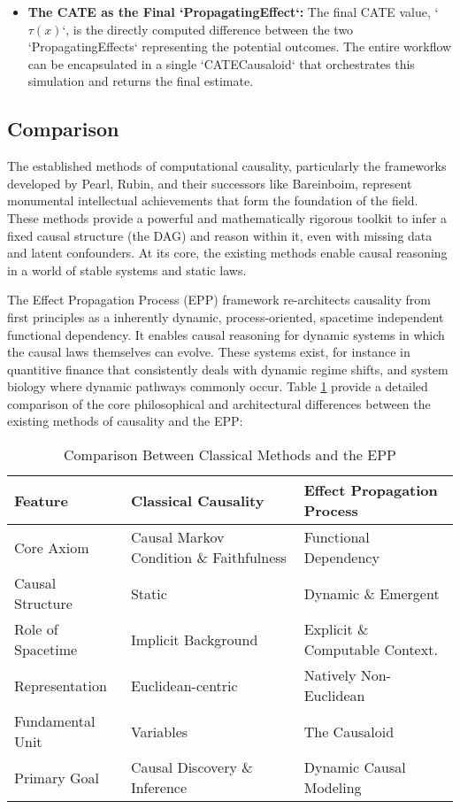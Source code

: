 \begin{itemize}
\item \textbf{The CATE as the Final `PropagatingEffect`:}
The final CATE value, `$\tau(x)$`, is the directly computed difference between the two `PropagatingEffects` representing the potential outcomes. The entire workflow can be encapsulated in a single `CATECausaloid` that orchestrates this simulation and returns the final estimate.
\end{itemize}


\subsection{Comparison}
\label{sec:epp_comparison}

The established methods of computational causality, particularly the frameworks developed by Pearl, Rubin, and their successors like Bareinboim, represent monumental intellectual achievements that form the foundation of the field. These methods provide a powerful and mathematically rigorous toolkit to infer a fixed causal structure (the DAG) and reason within it, even with missing data and latent confounders. At its core, the existing methods enable causal reasoning in a world of stable systems and static laws.

The Effect Propagation Process (EPP) framework re-architects causality from first principles as a  inherently dynamic, process-oriented, spacetime independent functional dependency. It enables causal reasoning for dynamic systems in which the causal laws themselves can evolve. These systems exist, for instance in quantitive finance that consistently deals with dynamic regime shifts, and system biology where dynamic pathways commonly occur. Table \ref{tab:epp_comparison} provide a detailed comparison of the core philosophical and architectural differences between the existing methods of causality and the EPP:


\begin{table}[h!]
\caption{Comparison Between Classical Methods and the EPP}
\label{tab:epp_comparison}
\begin{tabular}{|l|l|l|}
\hline
Feature           & Classical Causality                        & Effect Propagation Process      
\\ \hline
Core Axiom        & Causal Markov Condition \& Faithfulness       & Functional Dependency          \\ \hline
Causal Structure  & Static                                       & Dynamic \& Emergent            \\ \hline
Role of Spacetime & Implicit Background                          & Explicit \& Computable Context. \\ \hline
Representation    & Euclidean-centric                            & Natively Non-Euclidean         \\ \hline
Fundamental Unit  & Variables 									 & The Causaloid                  \\ \hline
Primary Goal      & Causal Discovery \& Inference                 & Dynamic Causal Modeling         \\ \hline
\end{tabular}
\end{table}


